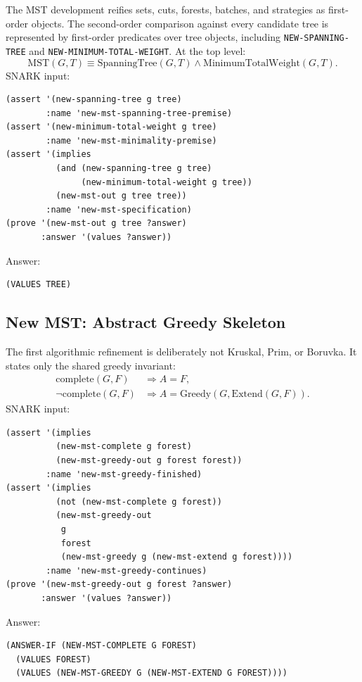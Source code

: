 \documentclass[runningheads]{llncs}
\begin{document}
The MST development reifies sets, cuts, forests, batches, and strategies as
first-order objects.  The second-order comparison against every candidate tree
is represented by first-order predicates over tree objects, including
\texttt{NEW-SPANNING-TREE} and \texttt{NEW-MINIMUM-TOTAL-WEIGHT}.  At the top
level:
\[
  \mathrm{MST}(G,T) \equiv
  \mathrm{SpanningTree}(G,T)\land \mathrm{MinimumTotalWeight}(G,T).
\]
SNARK input:
\begin{lstlisting}
(assert '(new-spanning-tree g tree)
        :name 'new-mst-spanning-tree-premise)
(assert '(new-minimum-total-weight g tree)
        :name 'new-mst-minimality-premise)
(assert '(implies
          (and (new-spanning-tree g tree)
               (new-minimum-total-weight g tree))
          (new-mst-out g tree tree))
        :name 'new-mst-specification)
(prove '(new-mst-out g tree ?answer)
       :answer '(values ?answer))
\end{lstlisting}
Answer:
\begin{lstlisting}
(VALUES TREE)
\end{lstlisting}

\subsection{New MST: Abstract Greedy Skeleton}

The first algorithmic refinement is deliberately not Kruskal, Prim, or Boruvka.
It states only the shared greedy invariant:
\begin{align*}
  \mathrm{complete}(G,F) &\Rightarrow A=F,\\
  \neg\mathrm{complete}(G,F) &\Rightarrow
    A=\mathrm{Greedy}(G,\mathrm{Extend}(G,F)).
\end{align*}
SNARK input:
\begin{lstlisting}
(assert '(implies
          (new-mst-complete g forest)
          (new-mst-greedy-out g forest forest))
        :name 'new-mst-greedy-finished)
(assert '(implies
          (not (new-mst-complete g forest))
          (new-mst-greedy-out
           g
           forest
           (new-mst-greedy g (new-mst-extend g forest))))
        :name 'new-mst-greedy-continues)
(prove '(new-mst-greedy-out g forest ?answer)
       :answer '(values ?answer))
\end{lstlisting}
Answer:
\begin{lstlisting}
(ANSWER-IF (NEW-MST-COMPLETE G FOREST)
  (VALUES FOREST)
  (VALUES (NEW-MST-GREEDY G (NEW-MST-EXTEND G FOREST))))
\end{lstlisting}
\end{document}
